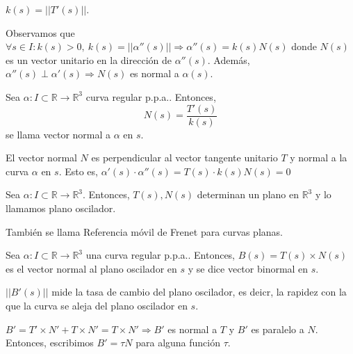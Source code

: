 \begin{obs}
  $k(s) = ||T'(s)||$.
\end{obs}

\begin{note}
  Observamos que $\forall s \in I: k(s) > 0, \ k(s) = ||\alpha''(s)|| \Rightarrow \alpha''(s) = k(s) N(s)$ donde $N(s)$ es un vector unitario en la dirección de $\alpha''(s)$. Además, $\alpha''(s) \perp \alpha'(s) \Rightarrow N(s)$ es normal a $\alpha(s)$.
\end{note}

\begin{defn}
  Sea $\alpha  : I \subset \mathbb{R} \to \mathbb{R}^{3}$ curva regular p.p.a.. Entonces, 
  \[ 
    N(s) = \frac{T'(s)}{k(s)} 
  \] 
  se llama vector normal a $\alpha$ en $s$.
\end{defn}

\begin{obs}
  El vector normal $N$ es perpendicular al vector tangente unitario $T$ y normal a la curva $\alpha$ en $s$. Esto es, $\alpha'(s) \cdot \alpha''(s) = T(s) \cdot k(s)N(s) = 0$
\end{obs}

\begin{defn}
  Sea $\alpha  : I \subset \mathbb{R} \to \mathbb{R}^{3}$. Entonces, $T(s),N(s)$ determinan un plano en $\mathbb{R}^{3}$ y lo llamamos plano oscilador.
\end{defn}

\begin{obs}
  También se llama Referencia móvil de Frenet para curvas planas.
\end{obs}

\begin{defn}
  Sea $\alpha  : I \subset \mathbb{R} \to \mathbb{R}^{3}$ una curva regular p.p.a.. Entonces, $B(s) = T(s) \times N(s)$ es el vector normal al plano oscilador en $s$ y se dice vector binormal en $s$.
\end{defn}

\begin{obs}
  $||B'(s)||$ mide la tasa de cambio del plano oscilador, es deicr, la rapidez con la que la curva se aleja del plano oscilador en $s$.
\end{obs}

\begin{note}
  $B' = T' \times N' + T \times N' = T \times N' \Rightarrow B'$ es normal a $T$ y $B'$ es paralelo a $N$. Entonces, escribimos $B' = \tau N$ para alguna función $\tau$.
\end{note}

